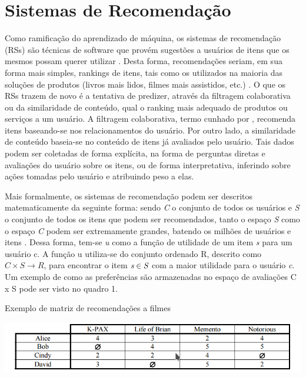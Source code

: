 \documentclass[12pt, openright, oneside, a4paper, brazil]{abntex2}
\begin{document}
\section{Sistemas de Recomendação}

Como ramificação do aprendizado de máquina, os sistemas de recomendação (RSs) são técnicas de software que provém sugestões a usuários de itens que os mesmos possam querer utilizar   \cite{resnick1997recommender, schafer1999recommender}. Desta forma, recomendações seriam, em sua forma mais simples, rankings de itens, tais como os utilizados na maioria das soluções de produtos (livros mais lidos, filmes mais assistidos, etc.) \cite{ricci2011introduction}. O que os RSs trazem de novo é a tentativa de predizer, através da filtragem colaborativa ou da similaridade de conteúdo, qual o ranking mais adequado de produtos ou serviços a um usuário. A filtragem colaborativa, termo cunhado por , recomenda itens baseando-se nos relacionamentos do usuário. Por outro lado, a similaridade de conteúdo baseia-se no conteúdo de itens já avaliados pelo usuário. Tais dados podem ser coletadas de forma explícita, na forma de perguntas diretas e avaliações do usuário sobre os itens, ou de forma interpretativa, inferindo sobre ações tomadas pelo usuário e atribuindo peso a elas.

Mais formalmente, os sistemas de recomendação podem ser descritos matematicamente da seguinte forma: sendo \emph{C} o conjunto de todos os usuários e \emph{S} o conjunto de todos os itens que podem ser recomendados, tanto o espaço \emph{S} como o espaço \emph{C} podem ser extremamente grandes, batendo os milhões de usuários e itens \cite{adomavicius2005toward, gomez2016netflix}. Dessa forma, tem-se \textit{u} como a função de utilidade de um item \emph{s} para um usuário c. A função u utiliza-se do conjunto ordenado R, descrito como $C \times S \rightarrow R$, para encontrar o item $\emph{s} \in \emph{S}$ com a maior utilidade para o usuário \emph{c}. Um exemplo de como as preferências são armazenadas no espaço de avaliações C x S pode ser visto no quadro 1.

\begin{quadro}[h!tp]

	\caption{\label{movie_matrix}Exemplo de matriz de recomendações a filmes}

	\begin{center}
		\includegraphics[scale=0.8]{images/movie_matrix.png}
	\end{center}


\end{quadro}
\end{document}
